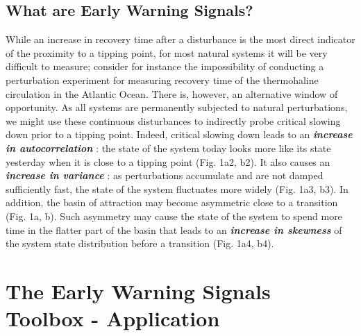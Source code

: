 \documentclass[12pt,a4paper,final]{article}
\begin{document}
\begin{doublespacing}
\subsection{What are Early Warning Signals?}
While an increase in recovery time after a disturbance is the most direct indicator of the proximity to a tipping point, for most natural systems it will be very difficult to measure; consider for instance the impossibility of conducting a perturbation experiment for measuring recovery time of the thermohaline circulation in the Atlantic Ocean. There is, however, an alternative window of opportunity. As all systems are permanently subjected to natural perturbations, we might use these continuous disturbances to indirectly probe critical slowing down prior to a tipping point. Indeed, critical slowing down leads to an \textit{\textbf{increase in autocorrelation}} \cite{Ives1995,Held2004}: the state of the system today looks more like its state yesterday when it is close to a tipping point (Fig. 1a2, b2). %
It also causes an \textit{\textbf{increase in variance}} \cite{Carpenter2006a}: as perturbations accumulate and are not damped sufficiently fast, the state of the system fluctuates more widely (Fig. 1a3, b3). In addition, the basin of attraction may become asymmetric close to a transition \cite{Scheffer2009a} (Fig. 1a, b). Such asymmetry may cause the state of the system to spend more time in the flatter part of the basin that leads to an \textit{\textbf{increase in skewness}} \cite{Guttal2008} of the system state distribution before a transition (Fig. 1a4, b4).

\section{The Early Warning Signals Toolbox - Application}

\end{doublespacing}
\end{document}
